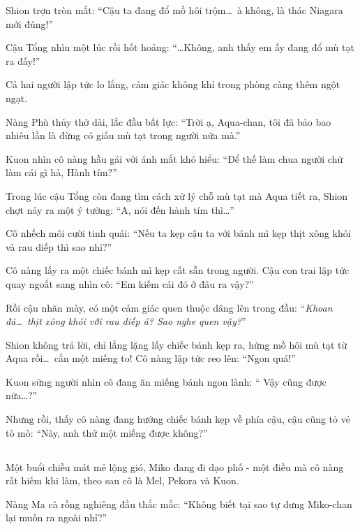 \documentclass[../main.tex]{subfiles}
\begin{document}
Shion trợn tròn mắt: ``Cậu ta đang đổ mồ hôi trộm\dots\ à không, là thác Niagara mới đúng!''

Cậu Tổng nhìn một lúc rồi hốt hoảng: ``\dots Không, anh thấy em ấy đang đổ mù tạt ra đấy!''

Cả hai người lập tức lo lắng, cảm giác không khí trong phòng càng thêm ngột ngạt.

Nàng Phù thủy thở dài, lắc đầu bất lực: ``Trời ạ, Aqua-chan, tôi đã bảo bao nhiêu lần là đừng có giấu mù tạt trong người nữa mà.''

Kuon nhìn cô nàng hầu gái với ánh mắt khó hiểu: ``Để thế làm chua người chứ làm cái gì hả, Hành tím?''

Trong lúc cậu Tổng còn đang tìm cách xử lý chỗ mù tạt mà Aqua tiết ra, Shion chợt nảy ra một ý tưởng: ``A, nói đến hành tím thì\dots''

Cô nhếch môi cười tinh quái: ``Nếu ta kẹp cậu ta với bánh mì kẹp thịt xông khói và rau diếp thì sao nhỉ?''

Cô nàng lấy ra một chiếc bánh mì kẹp cất sẵn trong người. Cậu con trai lập tức quay ngoắt sang nhìn cô: ``Em kiếm cái đó ở đâu ra vậy?''


Rồi cậu nhăn mày, có một cảm giác quen thuộc dâng lên trong đầu: ``\textit{Khoan đã\dots\ thịt xông khói với rau diếp á? Sao nghe quen vậy?}''

Shion không trả lời, chỉ lẳng lặng lấy chiếc bánh kẹp ra, hứng mồ hôi mù tạt từ Aqua rồi\dots\ cắn một miếng to! Cô nàng lập tức reo lên: ``Ngon quá!''

Kuon sững người nhìn cô đang ăn miếng bánh ngon lành: `` Vậy cũng được nữa\dots?''

Nhưng rồi, thấy cô nàng đang hướng chiếc bánh kẹp về phía cậu, cậu cũng tỏ vẻ tò mò: ``Này, anh thử một miếng được không?''

\subsection*{\label{ep-S13.IV}}

Một buổi chiều mát mẻ lộng gió, Miko đang đi dạo phố - một điều mà cô nàng rất hiếm khi làm, theo sau cô là Mel, Pekora và Kuon.


Nàng Ma cà rồng nghiêng đầu thắc mắc: ``Không biết tại sao tự dưng Miko-chan lại muốn ra ngoài nhỉ?''
\end{document}

